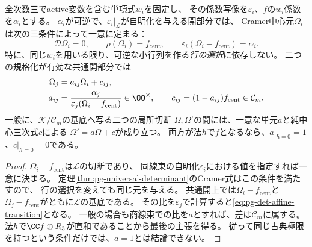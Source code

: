 \begin{proposition}[Cramer規格化の一意性と遷移]
\label{prop:pg-det-normalization-transition}
全次数三でactive変数を含む単項式$w_i$を固定し、
その係数写像を$\varepsilon_i$、$f$の$w_i$係数を$\alpha_i$とする。
$\alpha_i$が可逆で、$\varepsilon_i|_{\mathcal L}$が自明化を与える開部分では、
Cramer中心元$\Omega_i$は次の三条件によって一意に定まる：
\begin{equation}
 \mathcal D\Omega_i=0,\qquad
 \rho(\Omega_i)=f_{\mathrm{cent}},\qquad
 \varepsilon_i(\Omega_i-f_{\mathrm{cent}})=\alpha_i.
 \label{eq:pg-det-normalization-conditions}
\end{equation}
特に、同じ$w_i$を用いる限り、可逆な小行列を作る\emph{行の選択}に依存しない。
二つの規格化が有効な共通開部分では
\begin{equation}
 \begin{aligned}
 \Omega_j&=a_{ij}\Omega_i+c_{ij},\\
 a_{ij}&=
 \frac{\alpha_j}{\varepsilon_j(\Omega_i-f_{\mathrm{cent}})}
 \in\OO^\times,\qquad
 c_{ij}=(1-a_{ij})f_{\mathrm{cent}}\in\mathcal C_m.
 \end{aligned}
 \label{eq:pg-det-affine-transition}
\end{equation}
一般に、$\mathcal K/\mathcal C_m$の基底へ写る二つの局所切断
$\Omega,\Omega'$の間には、一意な単元$a$と純中心三次式$c$による
$\Omega'=a\Omega+c$が成り立つ。
両方が法$\hbar$で$f$となるなら、$a|_{\hbar=0}=1$、$c|_{\hbar=0}=0$である。
\end{proposition}
\begin{proof}
$\Omega_i-f_{\mathrm{cent}}$は$\mathcal L$の切断であり、
同線束の自明化$\varepsilon_i$における値を指定すれば一意に決まる。
定理\ref{thm:pg-universal-determinant}のCramer式はこの条件を満たすので、
行の選択を変えても同じ元を与える。
共通開上では$\Omega_i-f_{\mathrm{cent}}$と
$\Omega_j-f_{\mathrm{cent}}$がともに$\mathcal L$の基底である。
その比を$\varepsilon_j$で計算すると\eqref{eq:pg-det-affine-transition}となる。
一般の場合も商線束での比を$a$とすれば、差は$\mathcal C_m$に属する。
法$\hbar$で$\CC f\oplus R_3$が直和であることから最後の主張を得る。
従って同じ古典極限を持つという条件だけでは、$a=1$とは結論できない。
\end{proof}

